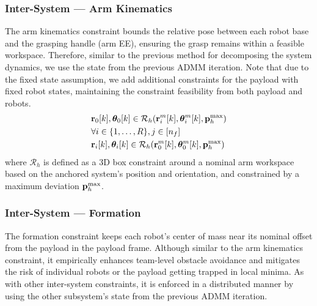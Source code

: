 \subsubsection{Inter-System --- \textbf{Arm Kinematics}}
The arm kinematics constraint bounds the relative pose between each robot base and the grasping handle (arm EE), ensuring the grasp remains within a feasible workspace. Therefore, similar to the previous method for decomposing the system dynamics, we use the state from the previous ADMM iteration. Note that due to the fixed state assumption, we add additional constraints for the payload with fixed robot states, maintaining the constraint feasibility from both payload and robots. 
\begin{equation}
\begin{aligned}
    & \mathbf{r}_0 [k], \bm{\theta}_0[k] \in \mathcal{R}_h(\mathbf{r}_i^{m}[k],\bm{\theta}_{i}^{m}[k], \mathbf{p}_h^{\text{max}})\\ 
    \nonumber
    & \forall i \in \{1,\dots,R\}, j \in [n_f]\\
    \label{eq:arm_rom}
    & \mathbf{r}_{i}[k], \bm{\theta}_{i}[k] \in \mathcal{R}_h(\mathbf{r}_0^{m}[k],\bm{\theta}_{0}^{m}[k], \mathbf{p}_h^{\text{max}})
\end{aligned}
\end{equation}
where $\mathcal{R}_h$ is defined as a 3D box constraint around a nominal arm workspace based on the anchored system's position and orientation, and constrained by a maximum deviation $\mathbf{p}_h^{\text{max}}$.

\subsubsection{Inter-System --- \textbf{Formation}}
The formation constraint keeps each robot’s center of mass near its nominal offset from the payload in the payload frame. Although similar to the arm kinematics constraint, it empirically enhances team-level obstacle avoidance and mitigates the risk of individual robots or the payload getting trapped in local minima. As with other inter-system constraints, it is enforced in a distributed manner by using the other subsystem’s state from the previous ADMM iteration.


